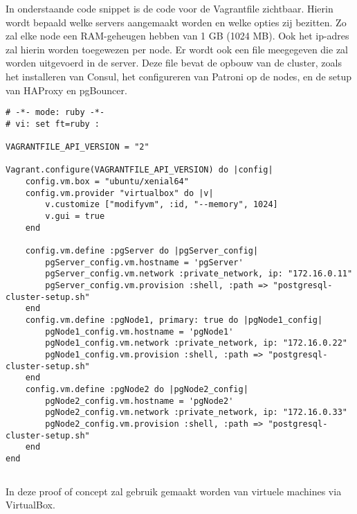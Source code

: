 In onderstaande code snippet is de code voor de Vagrantfile zichtbaar. Hierin wordt bepaald welke servers aangemaakt worden en welke opties zij bezitten. Zo zal elke node een RAM-geheugen hebben van 1 GB (1024 MB). Ook het ip-adres zal hierin worden toegewezen per node. Er wordt ook een file meegegeven die zal worden uitgevoerd in de server. Deze file bevat de opbouw van de cluster, zoals het installeren van Consul, het configureren van Patroni op de nodes, en de setup van HAProxy en pgBouncer.

\begin{lstlisting}
# -*- mode: ruby -*-
# vi: set ft=ruby :

VAGRANTFILE_API_VERSION = "2"

Vagrant.configure(VAGRANTFILE_API_VERSION) do |config|
    config.vm.box = "ubuntu/xenial64"
    config.vm.provider "virtualbox" do |v|
        v.customize ["modifyvm", :id, "--memory", 1024]
        v.gui = true
    end

    config.vm.define :pgServer do |pgServer_config|
        pgServer_config.vm.hostname = 'pgServer'
        pgServer_config.vm.network :private_network, ip: "172.16.0.11"
        pgServer_config.vm.provision :shell, :path => "postgresql-cluster-setup.sh"
    end
    config.vm.define :pgNode1, primary: true do |pgNode1_config|
        pgNode1_config.vm.hostname = 'pgNode1'
        pgNode1_config.vm.network :private_network, ip: "172.16.0.22"
        pgNode1_config.vm.provision :shell, :path => "postgresql-cluster-setup.sh"
    end
    config.vm.define :pgNode2 do |pgNode2_config|
        pgNode2_config.vm.hostname = 'pgNode2'
        pgNode2_config.vm.network :private_network, ip: "172.16.0.33"
        pgNode2_config.vm.provision :shell, :path => "postgresql-cluster-setup.sh"
    end
end
\end{lstlisting}


\subsection{}
\label{subsec:VirtualBox}
In deze proof of concept zal gebruik gemaakt worden van virtuele machines via VirtualBox.

\subsection{}
\label{subsec:Python3-pip}



